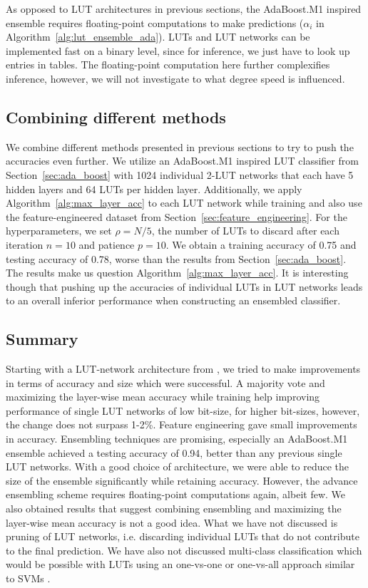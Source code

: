 \noindent As opposed to LUT architectures in previous sections, the AdaBoost.M1 inspired ensemble requires floating-point computations to make predictions ($\alpha_i$ in Algorithm~\ref{alg:lut_ensemble_ada}). LUTs and LUT networks can be implemented fast on a binary level, since for inference, we just have to look up entries in tables. The floating-point computation here further complexifies inference, however, we will not investigate to what degree speed is influenced.

\subsection{Combining different methods}
We combine different methods presented in previous sections to try to push the accuracies even further. We utilize an AdaBoost.M1 inspired LUT classifier from Section~\ref{sec:ada_boost} with 1024 individual 2-LUT networks that each have 5 hidden layers and 64 LUTs per hidden layer. Additionally, we apply Algorithm~\ref{alg:max_layer_acc} to each LUT network while training and also use the feature-engineered dataset from Section~\ref{sec:feature_engineering}. For the hyperparameters, we set $\rho = N/5$, the number of LUTs to discard after each iteration $n=10$ and patience $p=10$. We obtain a training accuracy of 0.75 and testing accuracy of 0.78, worse than the results from Section~\ref{sec:ada_boost}. The results make us question Algorithm~\ref{alg:max_layer_acc}. It is interesting though that pushing up the accuracies of individual LUTs in LUT networks leads to an overall inferior performance when constructing an ensembled classifier.

\subsection{Summary}
Starting with a LUT-network architecture from \cite{bib:chatterjee2018learning}, we tried to make improvements in terms of accuracy and size which were successful. A majority vote and maximizing the layer-wise mean accuracy while training help improving performance of single LUT networks of low bit-size, for higher bit-sizes, however, the change does not surpass 1-2\%. Feature engineering gave small improvements in accuracy. Ensembling techniques are promising, especially an AdaBoost.M1 ensemble achieved a testing accuracy of 0.94, better than any previous single LUT networks. With a good choice of architecture, we were able to reduce the size of the ensemble significantly while retaining accuracy. However, the advance ensembling scheme requires floating-point computations again, albeit few. We also obtained results that suggest combining ensembling and maximizing the layer-wise mean accuracy is not a good idea. What we have not discussed is pruning of LUT networks, i.e. discarding individual LUTs that do not contribute to the final prediction. We have also not discussed multi-class classification which would be possible with LUTs using an one-vs-one or one-vs-all approach similar to SVMs \cite{bib:bishop2006pattern}.

